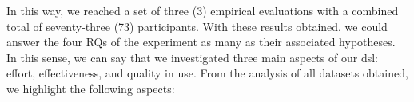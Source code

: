 In this way, we reached a set of three (3) empirical evaluations with a combined total of seventy-three (73) participants.
With these results obtained, we could answer the four RQs of the experiment as many as their associated hypotheses.
In this sense, we can say that we investigated three main aspects of our \ac{dsl}: effort, effectiveness, and quality in use.
From the analysis of all datasets obtained, we highlight the following aspects:

